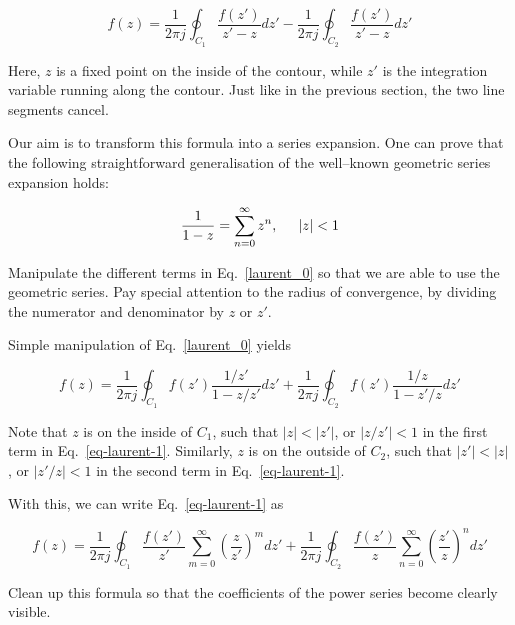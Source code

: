 \begin{equation}
f(z)=\frac{1}{2 \pi j }\oint_{{C}_1} \frac{f(z')} {z'-z} dz' -\frac{1}{2
\pi j }\oint_{{C}_2} \frac{f(z')} {z'-z} dz' \label{laurent_0}
\end{equation} 

Here, $z$ is a fixed point on the inside of the contour, while $z'$ is the integration variable running along the contour. Just like in the previous section, the two line segments cancel.

Our aim is to transform this formula into a series expansion. One can prove that the following straightforward generalisation of the well--known geometric series expansion holds:

\begin{equation}
\frac{1}{1-z} = \sum_{n=0}^\infty z^n, \hspace{.5cm} |z| < 1
\end{equation}

\begin{cue}
Manipulate the different terms in Eq.~\ref{laurent_0} so that we are able to use the geometric series. Pay special attention to the radius of convergence, by dividing the numerator and denominator by $z$ or $z'$.
\end{cue}

Simple manipulation of Eq.~\ref{laurent_0} yields

\begin{equation}
f(z)=\frac{1}{2 \pi j }\oint_{{C}_1} f(z') \frac{1 / z'} {1-z / z'} dz' + \frac{1}{2 \pi j }\oint_{{C}_2} f(z') \frac{1 / z} {1 - z' / z} dz'
\label{eq-laurent-1}
\end{equation} 

Note that $z$ is on the inside of ${C}_1$, such that $| z | < |z'| $, or $ |z / z' | < 1$ in the first term in Eq.~\ref{eq-laurent-1}. Similarly, $z$ is on the outside of ${C}_2$, such that $|z'| < | z | $, or $ |z'  / z| <
1$ in the second term in Eq.~\ref{eq-laurent-1}.

With this, we can write Eq.~\ref{eq-laurent-1} as

\begin{equation}
f(z)=\frac{1}{2 \pi j }\oint_{{C}_1} \frac{f(z')}{z'} \sum_{m=0}^{\infty} \left( \frac{z}{z'}\right)^m dz' + \frac{1}{2 \pi j }\oint_{{C}_2} \frac{f(z')}{z} \sum_{n=0}^{\infty} \left(\frac{z'}{z}\right)^n dz'
\end{equation}

\begin{cue}
Clean up this formula so that the coefficients of the power series become clearly visible.
\end{cue}

